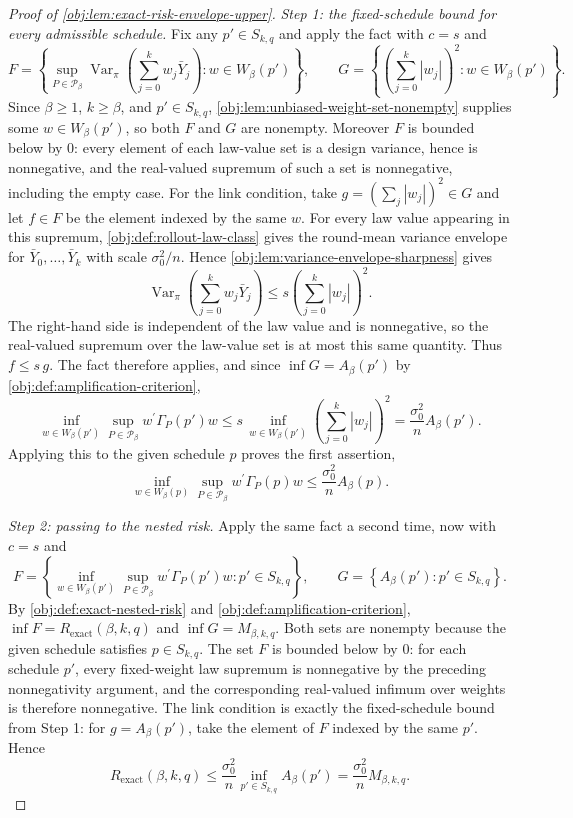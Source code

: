 \documentclass[11pt]{article}
\begin{document}
\begin{proof}[Proof of \cref{obj:lem:exact-risk-envelope-upper}]
\emph{Step 1: the fixed-schedule bound for every admissible schedule.}
Fix any \(p'\in S_{k,q}\) and apply the fact with \(c=s\) and
\[
F=\left\{
\sup_{P\in\mathcal P_\beta}
\operatorname{Var}_\pi\!\left(\sum_{j=0}^k w_j\bar Y_j\right):
w\in W_\beta(p')
\right\},
\qquad
G=\left\{
\left(\sum_{j=0}^k |w_j|\right)^2:
w\in W_\beta(p')
\right\}.
\]
Since \(\beta\ge1\), \(k\ge\beta\), and \(p'\in S_{k,q}\), \cref{obj:lem:unbiased-weight-set-nonempty} supplies some \(w\in W_\beta(p')\), so both \(F\) and \(G\) are nonempty. %
Moreover \(F\) is bounded below by \(0\): every element of each law-value set is a design variance, hence is nonnegative, and the real-valued supremum of such a set is nonnegative, including the empty case. %
For the link condition, take \(g=\left(\sum_j|w_j|\right)^2\in G\) and let \(f\in F\) be the element indexed by the same \(w\). For every law value appearing in this supremum, \cref{obj:def:rollout-law-class} gives the round-mean variance envelope for \(\bar Y_0,\ldots,\bar Y_k\) with scale \(\sigma_0^2/n\). Hence \cref{obj:lem:variance-envelope-sharpness} gives
\[
\operatorname{Var}_\pi\!\left(\sum_{j=0}^k w_j\bar Y_j\right)
\le
s\left(\sum_{j=0}^k |w_j|\right)^2 .
\]
The right-hand side is independent of the law value and is nonnegative, so the real-valued supremum over the law-value set is at most this same quantity. Thus \(f\le s\,g\). %
The fact therefore applies, and since \(\inf G=A_\beta(p')\) by \cref{obj:def:amplification-criterion},
\[
\inf_{w\in W_\beta(p')}
\sup_{P\in\mathcal P_\beta}
w^\prime\Gamma_P(p')w
\le
s\,
\inf_{w\in W_\beta(p')}
\left(\sum_{j=0}^k |w_j|\right)^2
=
\frac{\sigma_0^2}{n}A_\beta(p').
\]
Applying this to the given schedule \(p\) proves the first assertion,
\[
\inf_{w\in W_\beta(p)}
\sup_{P\in\mathcal P_\beta}
w^\prime\Gamma_P(p)w
\le
\frac{\sigma_0^2}{n}A_\beta(p).
\]

\emph{Step 2: passing to the nested risk.}
Apply the same fact a second time, now with \(c=s\) and
\[
F=\left\{
\inf_{w\in W_\beta(p')}
\sup_{P\in\mathcal P_\beta}
w^\prime\Gamma_P(p')w:
p'\in S_{k,q}
\right\},
\qquad
G=\left\{A_\beta(p'):p'\in S_{k,q}\right\}.
\]
By \cref{obj:def:exact-nested-risk} and \cref{obj:def:amplification-criterion}, \(\inf F=R_{\mathrm{exact}}(\beta,k,q)\) and \(\inf G=M_{\beta,k,q}\). Both sets are nonempty because the given schedule satisfies \(p\in S_{k,q}\). The set \(F\) is bounded below by \(0\): for each schedule \(p'\), every fixed-weight law supremum is nonnegative by the preceding nonnegativity argument, and the corresponding real-valued infimum over weights is therefore nonnegative. The link condition is exactly the fixed-schedule bound from Step 1: for \(g=A_\beta(p')\), take the element of \(F\) indexed by the same \(p'\). Hence
\[
R_{\mathrm{exact}}(\beta,k,q)
\le
\frac{\sigma_0^2}{n}
\inf_{p'\in S_{k,q}} A_\beta(p')
=
\frac{\sigma_0^2}{n}M_{\beta,k,q}.
\]
\end{proof}
\end{document}
